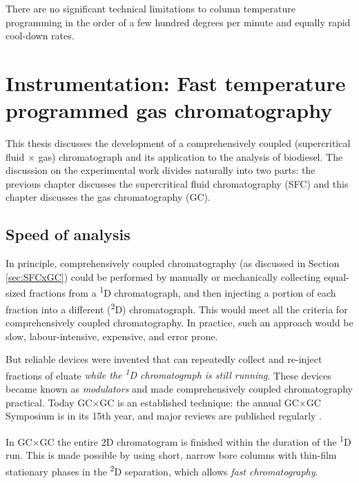 
\begin{savequote}[60mm] There are no significant technical limitations to column
temperature programming in the order of a few hundred degrees per minute and
equally rapid cool-down rates.
\end{savequote}

\chapter[Instrumentation: Fast GC]{Instrumentation: Fast temperature programmed gas chromatography} %

\label{Chapter5} %

This thesis discusses the development of a comprehensively coupled
(supercritical fluid × gas) chromatograph and its application to the analysis of
biodiesel. The discussion on the experimental work divides naturally into two
parts: the previous chapter discusses the supercritical fluid chromatography
(SFC) and this chapter discusses the gas chromatography (GC).

\section{Speed of analysis}

In principle, comprehensively coupled chromatography (as discussed in Section
\ref{sec:SFCxGC}) could be performed by manually or mechanically collecting
equal-sized fractions from a \textsuperscript{1}D chromatograph, and then
injecting a portion of each fraction into a different (\textsuperscript{2}D)
chromatograph. This would meet all the criteria for comprehensively coupled
chromatography. In practice, such an approach would be slow, labour-intensive,
expensive, and error prone.

But reliable devices were invented that can repeatedly collect and re-inject
fractions of eluate \textit{while the \textsuperscript{1}D chromatograph is
still running}. These devices became known as \textit{modulators} and made
comprehensively coupled chromatography practical. Today GC×GC is an established
technique: the annual GC×GC Symposium is in its 15th year, and major reviews are
published regularly \autocite{Seeley2013, Prebihalo2018}.

In GC×GC the entire 2D chromatogram is finished within the duration of the
\textsuperscript{1}D run. This is made possible by using short, narrow bore
columns with thin-film stationary phases in the \textsuperscript{2}D separation,
which allows \textit{fast chromatography}.

